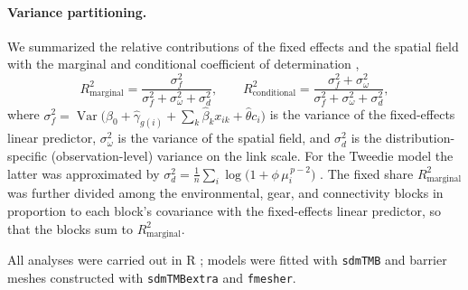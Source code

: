 \paragraph{Variance partitioning.}
We summarized the relative contributions of the fixed effects and the spatial
field with the marginal and conditional coefficient of determination
\citep{nakagawa2017},
\begin{equation}
R^2_{\text{marginal}}
  = \frac{\sigma^2_f}{\sigma^2_f+\sigma^2_\omega+\sigma^2_d},
\qquad
R^2_{\text{conditional}}
  = \frac{\sigma^2_f+\sigma^2_\omega}{\sigma^2_f+\sigma^2_\omega+\sigma^2_d},
\end{equation}
where $\sigma^2_f=\operatorname{Var}\!\big(\hat{\beta}_0+\hat{\gamma}_{g(i)}
+\sum_k\hat{\beta}_k x_{ik}+\hat{\theta}c_i\big)$ is the variance of the
fixed-effects linear predictor, $\sigma^2_\omega$ is the variance of the spatial
field, and $\sigma^2_d$ is the distribution-specific (observation-level)
variance on the link scale. For the Tweedie model the latter was approximated by
$\sigma^2_d=\tfrac{1}{n}\sum_i\log\!\big(1+\phi\,\mu_i^{\,p-2}\big)$
\citep{nakagawa2017}. The fixed share $R^2_{\text{marginal}}$ was further divided
among the environmental, gear, and connectivity blocks in proportion to each
block's covariance with the fixed-effects linear predictor, so that the blocks
sum to $R^2_{\text{marginal}}$.

All analyses were carried out in \textsf{R} \citep{rcore}; models were fitted
with \texttt{sdmTMB} \citep{anderson2024} and barrier meshes constructed with
\texttt{sdmTMBextra} and \texttt{fmesher}.
